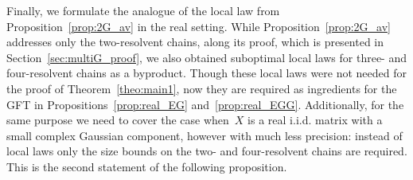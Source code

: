 \documentclass[10pt]{amsart}
\numberwithin{equation}{section}
\begin{document}
Finally, we formulate the analogue of the local law from Proposition~\ref{prop:2G_av} in the real setting. While Proposition~\ref{prop:2G_av} addresses only the two-resolvent chains, along its proof, which is presented in Section~\ref{sec:multiG_proof}, we also obtained suboptimal local laws for three- and four-resolvent chains as a byproduct. Though these local laws were not needed for the proof of Theorem~\ref{theo:main1}, now they are required as ingredients for the GFT in Propositions~\ref{prop:real_EG} and~\ref{prop:real_EGG}. Additionally, for the same purpose we need to cover the case when~$X$ is a real i.i.d. matrix with a small complex Gaussian component, however with much less precision: instead of local laws only the size bounds on the two- and four-resolvent chains are required. This is the second statement of the following proposition.
\end{document}
